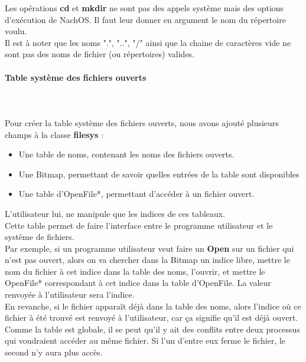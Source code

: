 \documentclass{report}
\newcommand{\myparagraph}[1]{\paragraph*{#1}\mbox{}\\}
\begin{document}
Les opérations \textbf{cd} et \textbf{mkdir} ne sont pas des appels système mais des options d'exécution de NachOS. Il faut leur donner en argument le nom du répertoire voulu.\\

Il est à noter que les noms ".", "..", "/" ainsi que la chaine de caractères vide ne sont pas des noms de fichier (ou répertoires) valides.
\myparagraph{Table système des fichiers ouverts}\\	
Pour créer la table système des fichiers ouverts, nous avons ajouté plusieurs champs à la classe \textbf{filesys} :
\begin{itemize}
\item Une table de noms, contenant les noms des fichiers ouverts.
\item Une Bitmap, permettant de savoir quelles entrées de la table sont disponibles

\item Une table d'OpenFile*, permettant d’accéder à un fichier ouvert.
\end{itemize}
L'utilisateur lui, ne manipule que les indices de ces tableaux.\\
Cette table permet de faire l'interface entre le programme utilisateur et le système de fichiers.\\

Par exemple, si un programme utilisateur veut faire un \textbf{Open} sur un fichier qui n'est pas ouvert, alors on va chercher dans la Bitmap un indice libre, mettre le nom du fichier à cet indice dans la table des noms, l'ouvrir, et mettre le OpenFile* correspondant à cet indice dans la table d'OpenFile.
La valeur renvoyée à l'utilisateur sera l'indice.\\

En revanche, si le fichier apparaît déjà dans la table des noms, alors l'indice où ce fichier à été trouvé est renvoyé à l'utilisateur, car ça signifie qu'il est déjà ouvert.\\

Comme la table est globale, il se peut qu'il y ait des conflits entre deux processus qui voudraient accéder au même fichier. Si l'un d'entre eux ferme le fichier, le second n'y aura plus accès.\\
\end{document}
